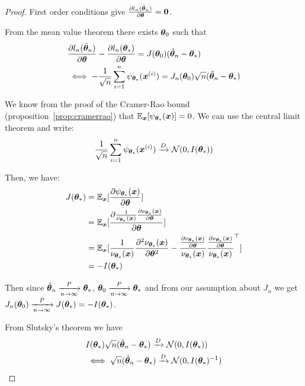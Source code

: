 \begin{proof}

  First order conditions give $\partialfrac{\thetab}{l_n(\hat{\thetab}_n)} = \bzero$.

  From the mean value theorem there exists $\thetab_0$ such that
  \begin{align}
    &\partialfrac{\thetab}{l_n(\hat{\thetab}_n)} - \partialfrac{\thetab}{l_n(\thetab_*)} = J(\thetab_0)(\hat{\thetab}_n - \thetab_*) \\
    &\iff -\frac1{\sqrt{n}} \sum_{i=1}^n  \psi_{\thetab_*}(\xb^{(i)}) = J_n(\thetab_0)\sqrt{n}(\hat{\thetab}_n - \thetab_*)
  \end{align}

  We know from the proof of the Cramer-Rao bound
  (proposition~\ref{prop:cramerrao}) that $\EE_{\xb} [\psi_{\thetab_*}(\xb)]=
  0$.  We can use the central limit theorem and write:
  \begin{align}
  \frac1{\sqrt{n}} \sum_{i=1}^n  \psi_{\thetab_*}(\xb^{(i)}) \xrightarrow[]{D}
  \Ncal(0, I(\thetab_*))
  \end{align}

  Then, we have:
  \begin{align}
  J(\thetab_*) &= \EE_{\xb}[\partialfrac{\thetab}{\psi_{\thetab_*}(\xb)}] \\
              &=  \EE_{\xb} [\partialfrac{\thetab}{ \frac1{\nu_{\thetab_*}(\xb)} \partialfrac{\thetab}{ \nu_{\thetab_*}(\xb)}} ] \\
              &= \EE_{\xb}[\frac1{\nu_{\thetab_*}(\xb)} \partialfrac{\thetab^2}{^2 \nu_{\thetab_*}(\xb)}-\frac{\partialfrac{\thetab}{ \nu_{\thetab_*}(\xb)}}{\nu_{\thetab_*}(\xb)}   \frac{\partialfrac{\thetab}{\nu_{\thetab_*}(\xb)}}{\nu_{\thetab_*}(\xb)}^{\top}  ] \\
              &= - I(\thetab_*) \\
  \end{align}

  Then since $\hat{\thetab}_n \xrightarrow[n \rightarrow \infty]{P} \thetab_*$, $\thetab_0
  \xrightarrow[n \rightarrow \infty]{P} \thetab_*$ and from our assumption about
  $J_n$ we get
  $J_n(\thetab_0) \xrightarrow[n \rightarrow \infty]{P} J(\thetab_*) =
  -I(\thetab_*)$.

  From Slutsky's theorem we have
  \begin{align}
    &I(\thetab_*) \sqrt{n}(\hat{\thetab}_n - \thetab_*) \xrightarrow[]{D}\Ncal(0, I(\thetab_*)) \\
    &\iff \sqrt{n}(\hat{\thetab}_n - \thetab_*) \xrightarrow[]{D}\Ncal(0, I(\thetab_*)^{-1})
  \end{align}
\end{proof}

